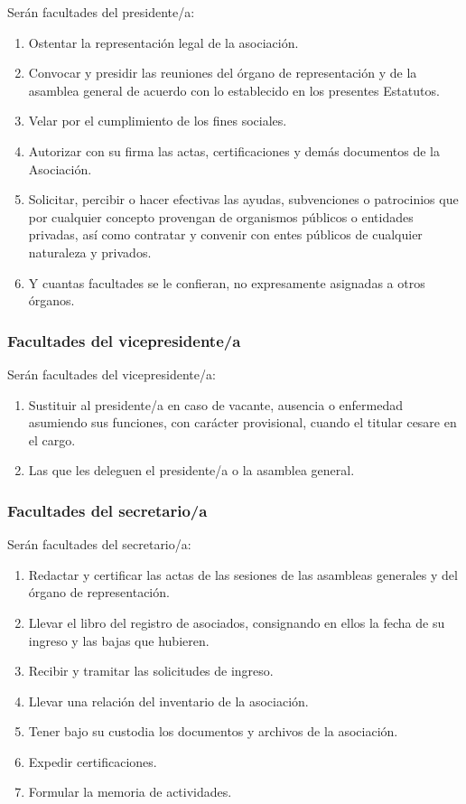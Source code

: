 \documentclass[a4paper, 12pt, oneside]{book}
\begin{document}
Serán facultades del presidente/a: 

\begin{enumerate}
    \item Ostentar la representación legal de la asociación. 
    \item Convocar y presidir las reuniones del órgano de representación y de la asamblea general de acuerdo con lo establecido en los presentes Estatutos. 
    \item Velar por el cumplimiento de los fines sociales. 
    \item Autorizar con su firma las actas, certificaciones y demás documentos de la Asociación. 
    \item Solicitar, percibir o hacer efectivas las ayudas, subvenciones o patrocinios que por cualquier concepto provengan de organismos públicos o entidades privadas, así como contratar y convenir con entes públicos de cualquier naturaleza y privados.
    \item Y cuantas facultades se le confieran, no expresamente asignadas a otros órganos.
\end{enumerate}

\subsubsection{Facultades del vicepresidente/a}

Serán facultades del vicepresidente/a:

\begin{enumerate}
    \item Sustituir al presidente/a en caso de vacante, ausencia o enfermedad asumiendo sus funciones, con carácter provisional, cuando el titular cesare en el cargo.
    \item Las que les deleguen el presidente/a o la asamblea general.
\end{enumerate}

\subsubsection{Facultades del secretario/a}

Serán facultades del secretario/a:

\begin{enumerate}
    \item Redactar y certificar las actas de las sesiones de las asambleas generales y del órgano de representación. 
    \item Llevar el libro del registro de asociados, consignando en ellos la fecha de su ingreso y las bajas que hubieren. 
    \item Recibir y tramitar las solicitudes de ingreso.
    \item Llevar una relación del inventario de la asociación.
    \item Tener bajo su custodia los documentos y archivos de la asociación. 
    \item Expedir certificaciones. 
    \item Formular la memoria de actividades.
\end{enumerate}
\end{document}
